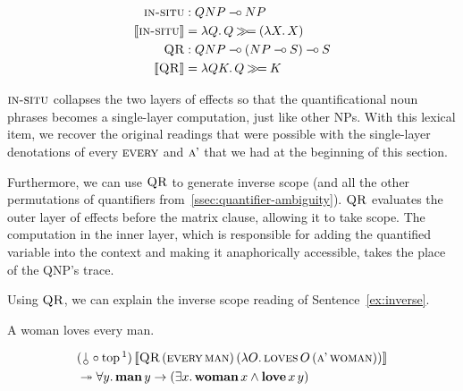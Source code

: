 \begin{align*}
  \textsc{in-situ} &: QNP \mathbin{{-}\mkern-3.5mu{\circ}} NP \\
  \llbracket \textsc{in-situ} \rrbracket &= \lambda Q.\, Q \mathbin{\gg\!=} (\lambda X.\, X) \\
  \textsc{QR} &: QNP \mathbin{{-}\mkern-3.5mu{\circ}} (NP \mathbin{{-}\mkern-3.5mu{\circ}} S) \mathbin{{-}\mkern-3.5mu{\circ}} S \\
  \llbracket \textsc{QR} \rrbracket &= \lambda Q K.\, Q \mathbin{\gg\!=} K
\end{align*}

$\textsc{in-situ}$ collapses the two layers of effects so that the
quantificational noun phrases becomes a single-layer computation, just like
other NPs. With this lexical item, we recover the original readings that
were possible with the single-layer denotations of every $\textsc{every}$ and
$\textsc{a'}$ that we had at the beginning of this section.

Furthermore, we can use $\textsc{QR}$ to generate inverse scope (and all the
other permutations of quantifiers
from~\ref{ssec:quantifier-ambiguity}). $\textsc{QR}$ evaluates the outer layer
of effects before the matrix clause, allowing it to take scope. The
computation in the inner layer, which is responsible for adding the
quantified variable into the context and making it anaphorically
accessible, takes the place of the QNP's trace.

Using $\textsc{QR}$, we can explain the inverse scope reading of
Sentence~\ref{ex:inverse}.

\begin{exe}
  \ex A woman loves every man. \label{ex:inverse}
\end{exe}

\begin{align*}
  &\ap{(\cherry \circ \TOP\footnotemark)}{\sem{\app{\abs{QR}}{(\ap{\abs{every}}{\abs{man}})}{(\lam{O}{\app{\abs{loves}}{O}{(\ap{\abs{a'}}{\abs{woman}})}})}}} \\
  &\tto \forall y.\, \ap{\obj{man}}{y} \to (\exists x.\, \ap{\obj{woman}}{x} \land \app{\obj{love}}{x}{y})
\end{align*}


